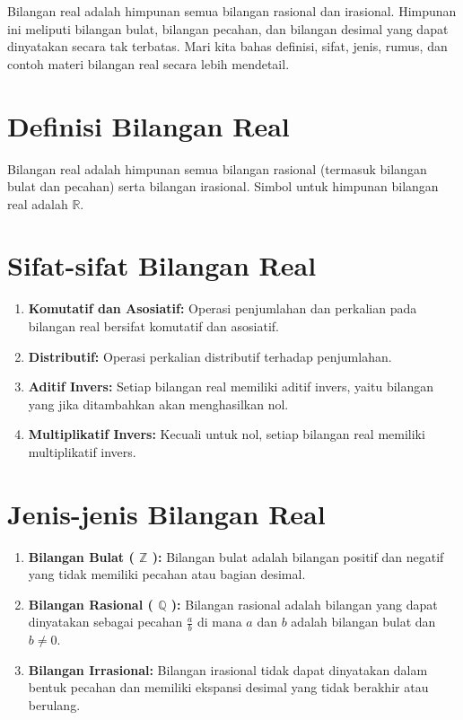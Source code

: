 \documentclass[
]{book}
\providecommand{\tightlist}{%
  \setlength{\itemsep}{0pt}\setlength{\parskip}{0pt}}
\begin{document}
Bilangan real adalah himpunan semua bilangan rasional dan irasional. Himpunan ini meliputi bilangan bulat, bilangan pecahan, dan bilangan desimal yang dapat dinyatakan secara tak terbatas. Mari kita bahas definisi, sifat, jenis, rumus, dan contoh materi bilangan real secara lebih mendetail.

\section{Definisi Bilangan Real}\label{definisi-bilangan-real}

Bilangan real adalah himpunan semua bilangan rasional (termasuk bilangan bulat dan pecahan) serta bilangan irasional. Simbol untuk himpunan bilangan real adalah \(\mathbb{R}\).

\section{Sifat-sifat Bilangan Real}\label{sifat-sifat-bilangan-real}

\begin{enumerate}
\def\labelenumi{\arabic{enumi}.}
\tightlist
\item
  \textbf{Komutatif dan Asosiatif:} Operasi penjumlahan dan perkalian pada bilangan real bersifat komutatif dan asosiatif.
\item
  \textbf{Distributif:} Operasi perkalian distributif terhadap penjumlahan.
\item
  \textbf{Aditif Invers:} Setiap bilangan real memiliki aditif invers, yaitu bilangan yang jika ditambahkan akan menghasilkan nol.
\item
  \textbf{Multiplikatif Invers:} Kecuali untuk nol, setiap bilangan real memiliki multiplikatif invers.
\end{enumerate}

\section{Jenis-jenis Bilangan Real}\label{jenis-jenis-bilangan-real}

\begin{enumerate}
\def\labelenumi{\arabic{enumi}.}
\item
  \textbf{Bilangan Bulat ( \(\mathbb{Z}\) ):} Bilangan bulat adalah bilangan positif dan negatif yang tidak memiliki pecahan atau bagian desimal.
\item
  \textbf{Bilangan Rasional ( \(\mathbb{Q}\) ):} Bilangan rasional adalah bilangan yang dapat dinyatakan sebagai pecahan \(\frac{a}{b}\) di mana \(a\) dan \(b\) adalah bilangan bulat dan \(b \neq 0\).
\item
  \textbf{Bilangan Irrasional:} Bilangan irasional tidak dapat dinyatakan dalam bentuk pecahan dan memiliki ekspansi desimal yang tidak berakhir atau berulang.
\end{enumerate}
\end{document}
